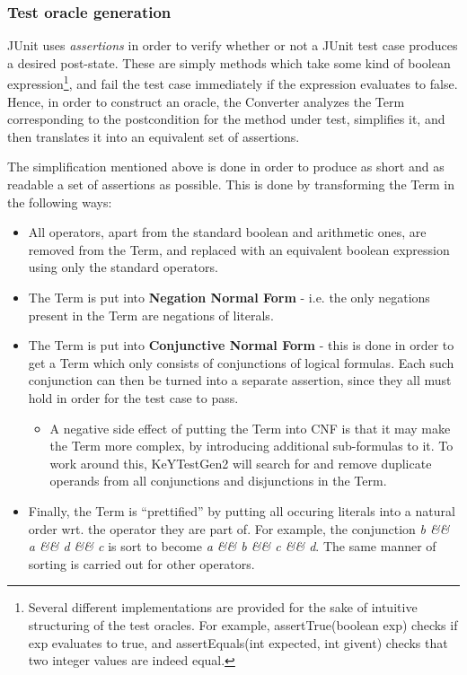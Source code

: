 \documentclass{article}
\newcommand{\tmem}[1]{{\em #1\/}}
\newcommand{\tmstrong}[1]{\textbf{#1}}
\newenvironment{itemizedot}{\begin{itemize} \renewcommand{\labelitemi}{$\bullet$}\renewcommand{\labelitemii}{$\bullet$}\renewcommand{\labelitemiii}{$\bullet$}\renewcommand{\labelitemiv}{$\bullet$}}{\end{itemize}}
\newenvironment{itemizeminus}{\begin{itemize} \renewcommand{\labelitemi}{$-$}\renewcommand{\labelitemii}{$-$}\renewcommand{\labelitemiii}{$-$}\renewcommand{\labelitemiv}{$-$}}{\end{itemize}}
\begin{document}
\subsubsection{Test oracle generation}

JUnit uses {\tmem{assertions}} in order to verify whether or not a JUnit test
case produces a desired post-state. These are simply methods which take some
kind of boolean expression{\footnote{Several different implementations are
provided for the sake of intuitive structuring of the test oracles. For
example, assertTrue(boolean exp) checks if exp evaluates to true, and
assertEquals(int expected, int givent) checks that two integer values are
indeed equal.}}, and fail the test case immediately if the expression
evaluates to false. Hence, in order to construct an oracle, the Converter
analyzes the Term corresponding to the postcondition for the method under
test, simplifies it, and then translates it into an equivalent set of
assertions.



The simplification mentioned above is done in order to produce as short and as
readable a set of assertions as possible. This is done by transforming the
Term in the following ways:
\begin{itemizedot}
  \item All operators, apart from the standard boolean and arithmetic ones,
  are removed from the Term, and replaced with an equivalent boolean
  expression using only the standard operators.
  
  \item The Term is put into {\tmstrong{Negation Normal Form}} - i.e. the only
  negations present in the Term are negations of literals. \ \
  
  \item The Term is put into {\tmstrong{Conjunctive Normal Form}} - this is
  done in order to get a Term which only consists of conjunctions of logical
  formulas. Each such conjunction can then be turned into a separate
  assertion, since they all must hold in order for the test case to pass.
  \begin{itemizeminus}
    \item A negative side effect of putting the Term into CNF is that it may
    make the Term more complex, by introducing additional sub-formulas to it.
    To work around this, KeYTestGen2 will search for and remove duplicate
    operands from all conjunctions and disjunctions in the Term.
  \end{itemizeminus}
  \item Finally, the Term is ``prettified'' by putting all occuring literals
  into a natural order wrt. the operator they are part of. For example, the
  conjunction {\tmem{b \&\& a \&\& d \&\& c}} is sort to become {\tmem{a \&\&
  b \&\& c \&\& d}}. The same manner of sorting is carried out for other
  operators.
\end{itemizedot}
\end{document}
